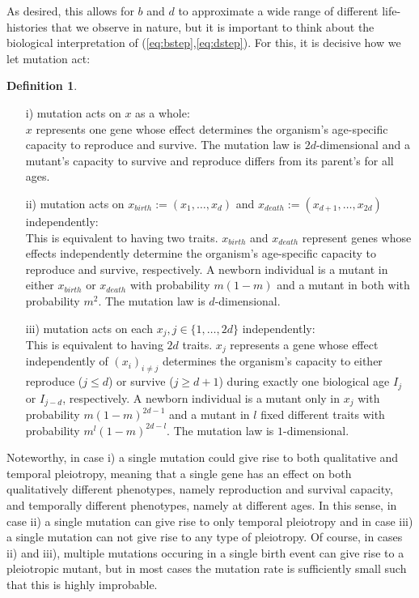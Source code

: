 \documentclass[11pt, a4paper]{article}
\theoremstyle{definition}
\newtheorem{definition}{Definition}
\begin{document}
    As desired, this allows for $b$ and $d$ to approximate a wide range of different life-histories that we observe in nature, but it is important to think about the biological interpretation of (\ref{eq:bstep},\ref{eq:dstep}). For this, it is decisive how we let mutation act:
    \begin{definition}\label{def1}
    \begin{itemize}
        \item[i)] mutation acts on $x$ as a whole:\\
            $x$ represents one gene whose effect determines the organism's age-specific capacity to reproduce and survive. The mutation law is $2d$-dimensional and a mutant's capacity to survive and reproduce differs from its parent's for all ages.
        \item[ii)] mutation acts on $x_{birth} := (x_1,\ldots,x_d)$ and $x_{death} := (x_{d+1},\ldots,x_{2d})$ independently:\\
            This is equivalent to having two traits. $x_{birth}$ and $x_{death}$ represent genes whose effects independently determine the organism's age-specific capacity to reproduce and survive, respectively. A newborn individual is a mutant in either $x_{birth}$ or $x_{death}$ with probability $m(1-m)$ and a mutant in both with probability $m^2$. The mutation law is $d$-dimensional.
        \item[iii)] mutation acts on each $x_j, j\in\{1,\ldots,2d\}$ independently:\\
            This is equivalent to having $2d$ traits. $x_j$ represents a gene whose effect independently of $(x_i)_{i\neq j}$ determines the organism's capacity to either reproduce ($j\leq d$) or survive ($j\geq d+1$) during exactly one biological age $I_j$ or $I_{j-d}$, respectively. A newborn individual is a mutant only in $x_j$ with probability $m(1-m)^{2d-1}$ and a mutant in $l$ fixed different traits with probability $m^l(1-m)^{2d-l}$. The mutation law is $1$-dimensional.
    \end{itemize}
    \end{definition}

    Noteworthy, in case i) a single mutation could give rise to both qualitative and temporal pleiotropy, meaning that a single gene has an effect on both qualitatively different phenotypes, namely reproduction and survival capacity, and temporally different phenotypes, namely at different ages. In this sense, in case ii) a single mutation can give rise to only temporal pleiotropy and in case iii) a single mutation can not give rise to any type of pleiotropy. Of course, in cases ii) and iii),
    multiple mutations occuring in a single birth event can give rise to a pleiotropic mutant, but in most cases the mutation rate is sufficiently small such that this is highly improbable.
\end{document}

